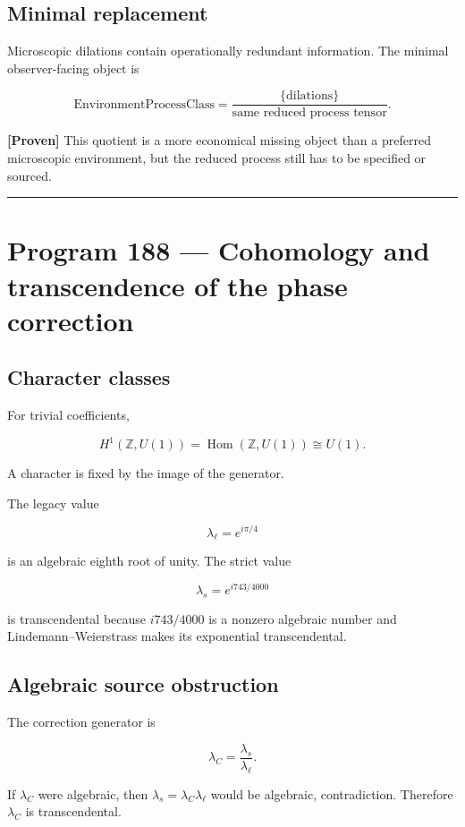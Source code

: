 \documentclass[11pt,a4paper,openany]{report}
\newcommand{\statusProven}{\textcolor{fingreen}{[Proven]}}
\begin{document}
\section{Minimal replacement}

Microscopic dilations contain operationally redundant information. The minimal observer-facing object is

\[
\text{EnvironmentProcessClass}
=
\frac{\{\text{dilations}\}}
{\text{same reduced process tensor}}.
\]

\textbf{\statusProven{}} This quotient is a more economical missing object than a preferred microscopic environment, but the reduced process still has to be specified or sourced.

\par\medskip\hrule\medskip

\chapter{Program 188 --- Cohomology and transcendence of the phase correction}

\section{Character classes}

For trivial coefficients,

\[
H^1(\mathbb Z,U(1))
=
\operatorname{Hom}(\mathbb Z,U(1))
\cong U(1).
\]

A character is fixed by the image of the generator.

The legacy value

\[
\lambda_\ell=e^{i\pi/4}
\]

is an algebraic eighth root of unity. The strict value

\[
\lambda_s=e^{i743/4000}
\]

is transcendental because \(i743/4000\) is a nonzero algebraic number and Lindemann--Weierstrass makes its exponential transcendental.

\section{Algebraic source obstruction}

The correction generator is

\[
\lambda_C
=
\frac{\lambda_s}{\lambda_\ell}.
\]

If \(\lambda_C\) were algebraic, then \(\lambda_s=\lambda_C\lambda_\ell\) would be algebraic, contradiction. Therefore \(\lambda_C\) is transcendental.
\end{document}
